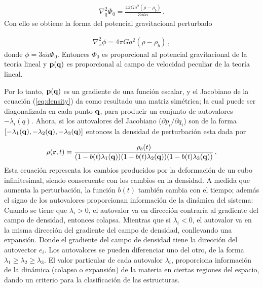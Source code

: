 \begin{align}
\nabla_{q}^{2}\Phi_{0}=\frac{4\pi Ga^{2}(\rho-\rho_{b})}{3ab\ddot{a}}\,.
\end{align}
%
Con ello se obtiene la forma del potencial gravitacional perturbado

\begin{align}
\nabla_{x}^{2}\phi=4\pi Ga^{2}(\rho-\rho_{b})\,,
\end{align} 
%
donde $\phi = 3a\ddot{a}\Phi_{0}$.  Entonces $\Phi_{0}$ es proporcional al potencial gravitacional de la teoría lineal y ${\bf{p(q)}}$ es proporcional al campo de velocidad peculiar de la teoría lineal. 

Por lo tanto, ${\bf{p(q)}}$ es un gradiente de una función escalar, y el Jacobiano de la ecuación (\ref{eq:density}) da como resultado una matriz simétrica; la cual puede ser diagonalizada en cada punto $\bf{q}$, para producir un conjunto de autovalores $-\lambda_{i}(q)$. Ahora, si los autovalores del Jacobiano ($\partial p_{i}/\partial q_{i}$) son de la forma $[-\lambda_{1}({\bf{q}}),-\lambda_{2}({\bf{q}}),-\lambda_{3}({\bf{q}})]$ entonces la densidad de perturbación esta dada por 

\begin{align}
\rho({\bf{r}},t)=\frac{\rho_{b}(t)}{(1-b(t)\lambda_{1}({\bf{q}}))(1-b(t)\lambda_{2}({\bf{q}}))(1-b(t)\lambda_{3}({\bf{q}}))}\,.
\end{align}
%
Esta ecuación representa los cambios producidos por la deformación de un cubo infinitesimal, siendo consecuente con los cambios en la densidad. A medida que aumenta la perturbación, la función $b(t)$ también cambia con el tiempo; además el signo de los autovalores proporcionan información de la dinámica del sistema: Cuando se tiene que $\lambda_{i}>0$, el autovalor va en dirección contraría al gradiente del campo de densidad, entonces colapsa. Mientras que si $\lambda_{i}<0$, el autovalor va en la misma dirección del gradiente del campo de densidad, conllevando una expansión. Donde el gradiente del campo de densidad tiene la dirección del autovector $e_{i}$. Los autovalores se pueden diferenciar uno del otro, de la forma $\lambda_{1}\geq \lambda_{2}\geq \lambda_{3}$. El valor particular de cada autovalor $\lambda_{i}$, proporciona información de la dinámica (colapso o expansión) de la materia en ciertas regiones del espacio, dando un criterio para la clasificación de las estructuras.  

